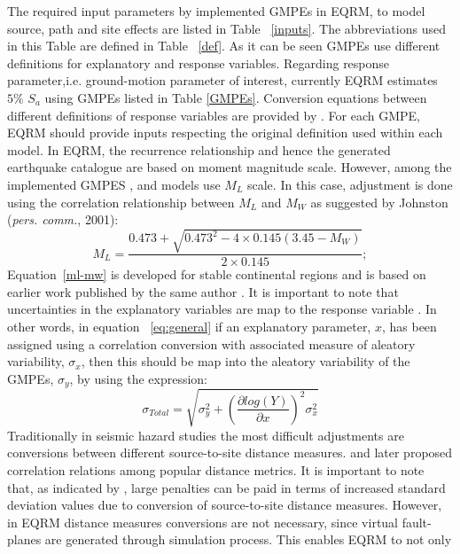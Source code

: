 The required input parameters by implemented GMPEs in EQRM, to model
source, path and site effects are listed in Table ~\ref{inputs}. The
abbreviations used in this Table are defined in Table ~\ref{def}. As
it can be seen GMPEs use different definitions for explanatory and
response variables. Regarding response parameter,i.e. ground-motion
parameter of interest, currently EQRM estimates $5 \%$ $S_a$ using
GMPEs listed in Table \ref{GMPEs}. Conversion equations between
different definitions of response variables are provided by
\citet{eqrm_Beyer06}.  For each GMPE, EQRM should provide inputs
respecting the original definition used within each model. In EQRM,
the recurrence relationship and hence the generated earthquake
catalogue are based on moment magnitude scale. However, among the
implemented GMPES \citet{eqrm_Gaull90a}, and \citet{eqrm_Liang08}
models use $M_L$ scale. In this case, adjustment is done using the
correlation relationship between $M_L$ and $M_W$ as suggested by
Johnston (\textit{pers. comm.}, 2001):
\begin{equation}\label{ml-mw}
M_L =
\frac{0.473+\sqrt{0.473^2-4\times0.145(3.45-M_W)}}{2\times0.145};
\end{equation}
Equation~\ref{ml-mw} is developed for stable continental regions and
is based on earlier work published by the same author
\citep{eqrm_Johnstone96a}. It is important to note that
uncertainties in the explanatory variables are map to the response
variable \citep{eqrm_Bommer05}. In other words, in equation
~\ref{eq:general} if an explanatory parameter, $x$, has been
assigned using a correlation conversion with associated measure of
aleatory variability, $\sigma_x$, then this should be map into the
aleatory variability of the GMPEs, $\sigma_y$, by using the
expression:
\begin{equation}
\sigma_{Total} = \sqrt{\sigma_y^2+(\dfrac{\partial log(Y)}{\partial
x})^2 \sigma_x^2}
\end{equation}
Traditionally in seismic hazard studies the most difficult
adjustments are conversions between different source-to-site
distance measures. \citet{eqrm_Scherbaum04b} and later
\citet{eqrm_Kak11} proposed correlation relations among popular
distance metrics. It is important to note that, as indicated by
\citet{eqrm_Scherbaum05}, large penalties can be paid in terms of
increased standard deviation values due to conversion of
source-to-site distance measures. However, in EQRM distance measures
conversions are not necessary, since virtual fault-planes are
generated through simulation process. This enables EQRM to not only
